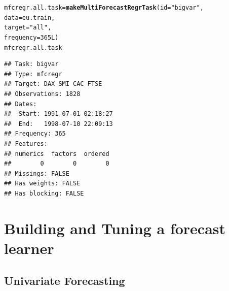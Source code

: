 \documentclass[12pt]{article}\usepackage[]{graphicx}\usepackage[]{color}
\makeatletter
\newcommand{\hlnum}[1]{\textcolor[rgb]{0.686,0.059,0.569}{#1}}%
\newcommand{\hlstr}[1]{\textcolor[rgb]{0.192,0.494,0.8}{#1}}%
\newcommand{\hlstd}[1]{\textcolor[rgb]{0.345,0.345,0.345}{#1}}%
\newcommand{\hlkwb}[1]{\textcolor[rgb]{0.69,0.353,0.396}{#1}}%
\newcommand{\hlkwc}[1]{\textcolor[rgb]{0.333,0.667,0.333}{#1}}%
\newcommand{\hlkwd}[1]{\textcolor[rgb]{0.737,0.353,0.396}{\textbf{#1}}}%
\newenvironment{kframe}{%
 \def\at@end@of@kframe{}%
 \ifinner\ifhmode%
  \def\at@end@of@kframe{\end{minipage}}%
  \begin{minipage}{\columnwidth}%
 \fi\fi%
 \def\FrameCommand##1{\hskip\@totalleftmargin \hskip-\fboxsep
 \colorbox{shadecolor}{##1}\hskip-\fboxsep
     \hskip-\linewidth \hskip-\@totalleftmargin \hskip\columnwidth}%
 \MakeFramed {\advance\hsize-\width
   \@totalleftmargin\z@ \linewidth\hsize
   \@setminipage}}%
 {\par\unskip\endMakeFramed%
 \at@end@of@kframe}
\newenvironment{knitrout}{}{} %
\theoremstyle{definition}
\makeatother
\begin{document}
\singlespacing
\begin{knitrout}
\color{fgcolor}\begin{kframe}
\begin{alltt}
\hlstd{mfcregr.all.task} \hlkwb{=} \hlkwd{makeMultiForecastRegrTask}\hlstd{(}\hlkwc{id} \hlstd{=} \hlstr{"bigvar"}\hlstd{,}
                                             \hlkwc{data} \hlstd{= eu.train,}
                                             \hlkwc{target} \hlstd{=} \hlstr{"all"}\hlstd{,}
                                             \hlkwc{frequency} \hlstd{=} \hlnum{365L}\hlstd{)}
\hlstd{mfcregr.all.task}
\end{alltt}
\begin{verbatim}
## Task: bigvar
## Type: mfcregr
## Target: DAX SMI CAC FTSE
## Observations: 1828
## Dates:
##  Start: 1991-07-01 02:18:27 
##  End:   1998-07-10 22:09:13
## Frequency: 365
## Features:
## numerics  factors  ordered 
##        0        0        0 
## Missings: FALSE
## Has weights: FALSE
## Has blocking: FALSE
\end{verbatim}
\end{kframe}
\end{knitrout}
\doublespacing

\section{Building and Tuning a forecast learner}

\subsection{Univariate Forecasting}
\end{document}
